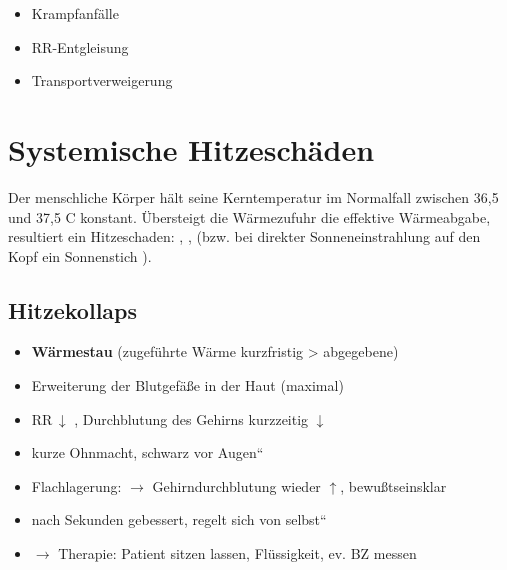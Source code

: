 \begin{itemize}
    \item Krampfanfälle
    \item RR-Entgleisung
    \item Transportverweigerung
\end{itemize}




\section{Systemische Hitzeschäden}

Der menschliche Körper hält seine Kerntemperatur  im Normalfall
zwischen 36,5{\textdegree}  und 37,5{\textdegree} C  konstant.
\"Ubersteigt  die Wärmezufuhr die effektive  Wärmeabgabe,
resultiert ein Hitzeschaden:  , 
 , 
 (bzw. bei  direkter Sonneneinstrahlung auf den Kopf ein  Sonnen\-stich
).



\subsection{Hitzekollaps}

{\begin{itemize} \item
\textbf{Wärmestau}  (zugef\"uhrte Wärme  kurzfristig {\textgreater} abgegebene)
\item Erweiterung der Blutgefä{\ss}e in der Haut  (maximal)
\item RR\,${\downarrow}$ , Durchblutung des Gehirns
kurzzeitig ${\downarrow}$
\item kurze Ohnmacht, {\quotedblbase}schwarz vor Augen{\textquotedblleft}
\end{itemize}}

\begin{itemize}
\item Flachlagerung: ${\rightarrow}$ Gehirndurchblutung
wieder ${\uparrow}$, bewu{\ss}tseinsklar
\item nach Sekunden gebessert, {\quotedblbase}regelt sich von
selbst{\textquotedblleft}
\end{itemize}
\begin{itemize}
\item ${\rightarrow}$ Therapie: Patient sitzen lassen,
Fl\"ussigkeit, ev. BZ messen
\end{itemize}



